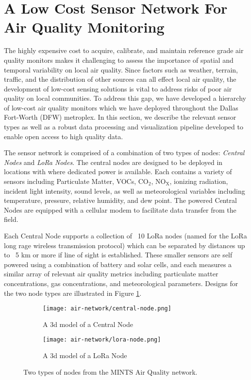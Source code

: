 \section{A Low Cost Sensor Network For Air Quality Monitoring}

The highly expensive cost to acquire, calibrate, and maintain reference grade air quality monitors makes it challenging to assess the importance of spatial and temporal variability on local air quality. Since factors such as weather, terrain, traffic, and the distribution of other sources can all effect local air quality, the development of low-cost sensing solutions is vital to address risks of poor air quality on local communities. To address this gap, we have developed a hierarchy of low-cost air quality monitors which we have deployed throughout the Dallas Fort-Worth (DFW) metroplex. In this section, we describe the relevant sensor types as well as a robust data processing and visualization pipeline developed to enable open access to high quality data.

The sensor network is comprised of a combination of two types of nodes: \textit{Central Nodes} and \textit{LoRa Nodes}. The central nodes are designed to be deployed in locations with where dedicated power is available. Each contains a variety of sensors including Particulate Matter, VOCs, $\mathrm{CO_2}$, $\mathrm{NO_X}$, ionizing radiation, incident light intensity, sound levels, as well as meteorological variables including temperature, pressure, relative humidity, and dew point. The powered Central Nodes are equipped with a cellular modem to facilitate data transfer from the field.

Each Central Node supports a collection of ~10 LoRa nodes (named for the LoRa long rage wireless transmission protocol) which can be separated by distances up to ~5 km or more if line of sight is established. These smaller sensors are self powered using a combination of battery and solar cells, and each measures a similar array of relevant air quality metrics including particulate matter concentrations, gas concentrations, and meteorological parameters. Designs for the two node types are illustrated in Figure \ref{fig:mints-nodes}.
\begin{figure}[!hbt]
  \begin{subfigure}{.5\textwidth}
    \centering
    \texttt{[image: air-network/central-node.png]}
    \caption{A 3d model of a Central Node}
  \end{subfigure}
  \begin{subfigure}{.5\textwidth}
    \centering
    \texttt{[image: air-network/lora-node.png]}
    \caption{A 3d model of a LoRa Node}
  \end{subfigure}
  \caption{Two types of nodes from the MINTS Air Quality network.}
  \label{fig:mints-nodes}
\end{figure}

